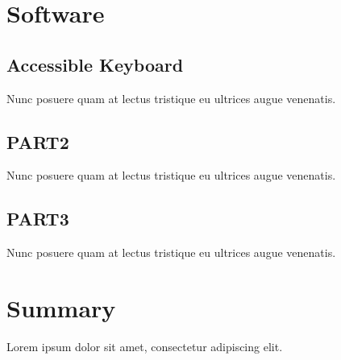 \section{Software}


\subsection{Accessible Keyboard}

Nunc posuere quam at lectus tristique eu ultrices augue venenatis.

\subsection{PART2}

Nunc posuere quam at lectus tristique eu ultrices augue venenatis.

\subsection{PART3}

Nunc posuere quam at lectus tristique eu ultrices augue venenatis.


\section{Summary}

Lorem ipsum dolor sit amet, consectetur adipiscing elit.